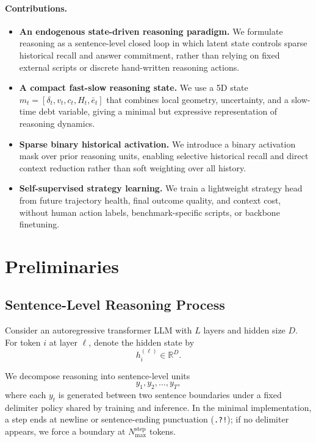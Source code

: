 \documentclass{article}
\newcommand{\R}{\mathbb{R}}
\begin{document}
\paragraph{Contributions.}
\begin{itemize}[leftmargin=1.3em, itemsep=0.2em]
    \item \textbf{An endogenous state-driven reasoning paradigm.} We formulate reasoning as a sentence-level closed loop in which latent state controls sparse historical recall and answer commitment, rather than relying on fixed external scripts or discrete hand-written reasoning actions.
    \item \textbf{A compact fast-slow reasoning state.} We use a 5D state $m_t=[\delta_t,v_t,c_t,H_t,\bar e_t]$ that combines local geometry, uncertainty, and a slow-time debt variable, giving a minimal but expressive representation of reasoning dynamics.
    \item \textbf{Sparse binary historical activation.} We introduce a binary activation mask over prior reasoning units, enabling selective historical recall and direct context reduction rather than soft weighting over all history.
    \item \textbf{Self-supervised strategy learning.} We train a lightweight strategy head from future trajectory health, final outcome quality, and context cost, without human action labels, benchmark-specific scripts, or backbone finetuning.
\end{itemize}

\section{Preliminaries}
\label{sec:prelim}

\subsection{Sentence-Level Reasoning Process}
Consider an autoregressive transformer LLM with $L$ layers and hidden size $D$. For token $i$ at layer $\ell$, denote the hidden state by
\[
h_i^{(\ell)} \in \R^D.
\]

We decompose reasoning into sentence-level units
\[
y_1,y_2,\dots,y_T,
\]
where each $y_t$ is generated between two sentence boundaries under a fixed delimiter policy shared by training and inference. In the minimal implementation, a step ends at newline or sentence-ending punctuation (\texttt{.?!}); if no delimiter appears, we force a boundary at $N_{\max}^{\mathrm{step}}$ tokens.
\end{document}
